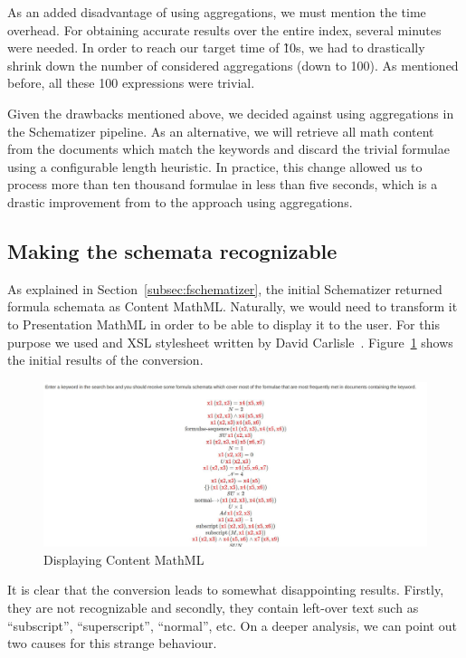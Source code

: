 \documentclass[a4paper,11pt,oneside]{article}
\def\cmml{\textsf{Content MathML}\xspace}
\def\pmml{\textsf{Presentation MathML}\xspace}
\begin{document}
As an added disadvantage of using aggregations, we must mention the time
overhead. For obtaining accurate results over the entire index, several
minutes were needed. In order to reach our target time of \~10s, we had to
drastically shrink down the number of considered aggregations (down to 100).
As mentioned before, all these 100 expressions were trivial.

Given the drawbacks mentioned above, we decided against using aggregations in
the Schematizer pipeline. As an alternative, we will retrieve all math content
from the documents which match the keywords and discard the trivial formulae
using a configurable length heuristic. In practice, this change allowed us to
process more than ten thousand formulae in less than five seconds, which is a
drastic improvement from to the approach using aggregations.

\subsection{Making the schemata recognizable}\label{subsec:make_sch_recog}
As explained in Section~\ref{subsec:fschematizer}, the initial Schematizer
returned formula schemata as \cmml. Naturally, we would need to transform it to
\pmml in order to be able to display it to the user. For this purpose we used
and XSL stylesheet written by David Carlisle~\cite{carlisle:online}. 
Figure~\ref{fig:cmml_display} shows the initial results of the conversion.

\begin{figure}[ht]\centering
    \includegraphics[width=12.8cm]{img/firstAttempt.jpg}
    \caption{Displaying Content MathML}\label{fig:cmml_display}
\end{figure}

It is clear that the conversion leads to somewhat disappointing results.
Firstly, they are not recognizable and secondly, they contain left-over text
such as ``subscript'', ``superscript'', ``normal'', etc.
On a deeper analysis, we can point out two causes for this strange behaviour.
\end{document}
